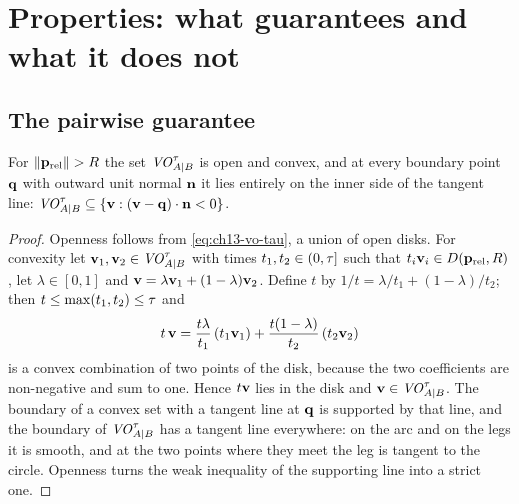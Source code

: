 \section{Properties: what \orca guarantees and what it does not}
\label{sec:ch13-properties}

\subsection{The pairwise guarantee}

\begin{lemma}
\label{thm:ch13-convex}
For $\left\lVert \mathbf{p}_{\mathrm{rel}} \right\rVert > R$ the set $\mathit{VO}^{\tau}_{A|B}$ is open and
convex, and at every boundary point $\mathbf{q}$ with outward unit normal
$\mathbf{n}$ it lies entirely on the inner side of the tangent line:
$\mathit{VO}^{\tau}_{A|B} \subseteq \left\{ \mathbf{v} : (\mathbf{v} - \mathbf{q})\cdot\mathbf{n} < 0 \right\}$.
\end{lemma}
\begin{proof}
Openness follows from \cref{eq:ch13-vo-tau}, a union of open disks. For
convexity let $\mathbf{v}_1, \mathbf{v}_2 \in \mathit{VO}^{\tau}_{A|B}$ with times
$t_1, t_2 \in (0, \tau]$ such that $t_i\mathbf{v}_i \in D(\mathbf{p}_{\mathrm{rel}},R)$,
let $\lambda \in [0, 1]$ and $\mathbf{v} = \lambda\mathbf{v}_1 + (1-\lambda)\mathbf{v}_2$.
Define $t$ by $1/t = \lambda/t_1 + (1-\lambda)/t_2$; then
$t \le \max(t_1, t_2) \le \tau$ and
\[
  t\,\mathbf{v} = \frac{t\lambda}{t_1}\,(t_1\mathbf{v}_1) + \frac{t(1-\lambda)}{t_2}\,(t_2\mathbf{v}_2)
\]
is a convex combination of two points of the disk, because the two
coefficients are non-negative and sum to one. Hence $t\mathbf{v}$ lies in the
disk and $\mathbf{v} \in \mathit{VO}^{\tau}_{A|B}$. The boundary of a convex set with a
tangent line at $\mathbf{q}$ is supported by that line, and the boundary of
$\mathit{VO}^{\tau}_{A|B}$ has a tangent line everywhere: on the arc and on the legs
it is smooth, and at the two points where they meet the leg is tangent to
the circle. Openness turns the weak inequality of the supporting line into a
strict one.
\end{proof}


